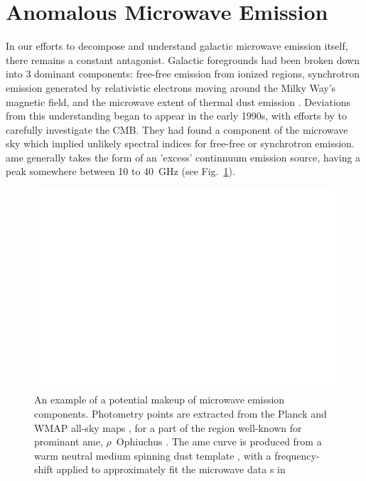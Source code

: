   \section{Anomalous Microwave Emission}
      In our efforts to decompose and understand galactic microwave emission itself, there remains a constant antagonist. Galactic foregrounds had been broken down into 3 dominant components: free-free emission from ionized regions, synchrotron emission generated by relativistic electrons moving around the Milky Way's magnetic field, and the microwave extent of thermal dust emission \citep{wmap03b, leach08, planckXII}. Deviations from this understanding began to appear in the early 1990s, with efforts by \cite{kogut96, leitch97} to carefully investigate the CMB. They had found a component of the microwave sky which implied unlikely spectral indices for free-free or synchrotron emission. \acrshort{ame} generally takes the form of an 'excess' continnuum emission source, having a peak somewhere between 10 to 40~GHz (see Fig.~\ref{fig:mw_foregrounds_demo_rOph}).
            \begin{figure}
              \centering
              \includegraphics[width=\textwidth]{../Plots/ch_intro/mw_foregrounds_demo_rOph.pdf}
                \caption{An example of a potential makeup of microwave emission components. Photometry points are extracted from the Planck and WMAP all-sky maps \citep{hfi14viii}, for a part of the region well-known for prominant \acrshort{ame}, $\rho$~Ophiuchus \citep{planckxx11}. The \acrshort{ame} curve is produced from a warm neutral medium spinning dust template \citep{ali-haimoud09}, with a frequency-shift applied to approximately fit the microwave data s in \cite{planck15X}}
              \label{fig:mw_foregrounds_demo_rOph}
            \end{figure}
